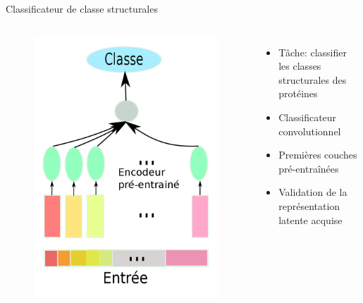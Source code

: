 \documentclass{beamer}
\begin{document}
\begin{frame}{Classificateur de classe structurales}

  \begin{columns}
    \begin{figure}
      \centering
      \includegraphics[scale=0.135]{../Figures/Class}
    \end{figure}

    \begin{itemize}
    \item Tâche: classifier les classes structurales des protéines\pause
    \item Classificateur convolutionnel\pause
    \item Premières couches pré-entraînées\pause
    \item Validation de la représentation latente acquise
    \end{itemize}
  \end{columns}

 \end{frame}
\end{document}
